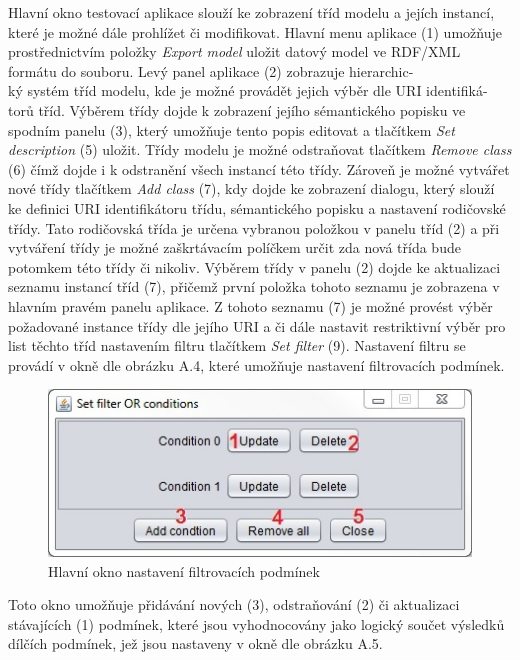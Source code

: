 \documentclass{projekt}
\begin{document}
Hlavní okno testovací aplikace slouží ke zobrazení tříd modelu a jejích instancí, které je možné dále prohlížet či modifikovat. Hlavní menu aplikace (1) umožňuje prostřednictvím položky {\it Export model} uložit datový model ve RDF/XML formátu do souboru. Levý panel aplikace (2) zobrazuje hierarchic-\\ký systém tříd modelu, kde je možné provádět jejich výběr dle URI identifiká-\\torů tříd. Výběrem třídy dojde k zobrazení jejího sémantického popisku ve spodním panelu (3), který umožňuje tento popis editovat a tlačítkem {\it Set description} (5) uložit. Třídy modelu je možné odstraňovat tlačítkem {\it Remove class} (6) čímž dojde i k odstranění všech instancí této třídy. Zároveň je možné vytvářet nové třídy tlačítkem {\it Add class} (7), kdy dojde ke zobrazení dialogu, který slouží ke definici URI identifikátoru třídu, sémantického popisku a nastavení rodičovské třídy. Tato rodičovská třída je určena vybranou položkou v panelu tříd (2) a při vytváření třídy je možné zaškrtávacím políčkem určit zda nová třída bude potomkem této třídy či nikoliv. Výběrem třídy v panelu (2) dojde ke aktualizaci seznamu instancí tříd (7), přičemž první položka tohoto seznamu je zobrazena v hlavním pravém panelu aplikace. Z tohoto seznamu (7) je možné provést výběr požadované instance třídy dle jejího URI a či dále nastavit restriktivní výběr pro list těchto tříd nastavením filtru tlačítkem {\it Set filter} (9). Nastavení filtru se provádí v okně dle obrázku A.4, které umožňuje nastavení filtrovacích podmínek.


\begin{figure}[htb!]
\begin{center}
\includegraphics[scale=0.8]{manualTestFilterA.jpg}
\caption{Hlavní okno nastavení filtrovacích podmínek}
\end{center}
\end{figure}


Toto okno umožňuje přidávání nových (3), odstraňování (2) či aktualizaci stávajících (1) podmínek, které jsou vyhodnocovány jako logický součet výsledků dílčích podmínek, jež jsou nastaveny v okně dle obrázku A.5. 
\end{document}
